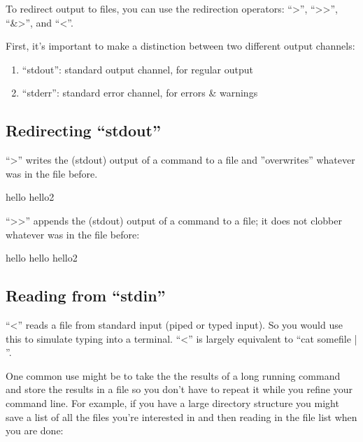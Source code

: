 To redirect output to files, you can use the redirection operators: ``>'', ``>>'', ``&>'', and ``<''. 

First, it's important to make a distinction between two different output channels:

\begin{enumerate}
 \item ``stdout'': standard output channel, for regular output
 \item ``stderr'': standard error channel, for errors & warnings
\end{enumerate}

\subsection{Redirecting ``stdout''}

``>'' writes the (stdout) output of a command to a file and ''overwrites'' whatever was in the file before.

\begin{prompt}
    hello
    hello2
\end{prompt}

``>>'' appends the (stdout) output of a command to a file; it does not clobber whatever was in the file before:

\begin{prompt}
    hello
    hello
    hello2
\end{prompt}

\subsection{Reading from ``stdin''}

``<'' reads a file from standard input (piped or typed input).
So you would use this to simulate typing into a terminal. ``<'' is largely equivalent to ``cat somefile | ''.

One common use might be to take the the results of a long running command and store the results in a file so you don't have to repeat it while you refine your command line. For example, if you have a large directory structure you might save a list of all the files you're interested in and then reading in the file list when you are done:

